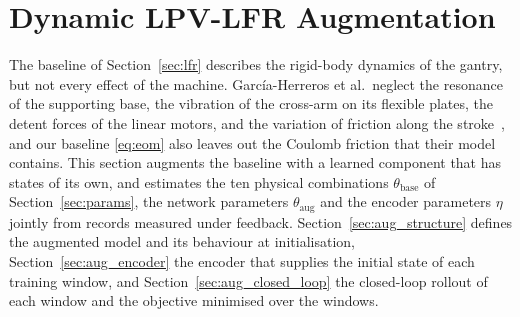 \section{Dynamic LPV-LFR Augmentation}\label{sec:augmentation}

The baseline of Section~\ref{sec:lfr} describes the rigid-body dynamics of
the gantry, but not every effect of the machine.
Garc\'ia-Herreros et al.\ neglect the resonance of the supporting base, the
vibration of the cross-arm on its flexible plates, the detent forces of the
linear motors, and the variation of friction along the
stroke~\cite[Sec.~2.4]{garcia2013model}, and our baseline \eqref{eq:eom}
also leaves out the Coulomb friction that their model contains.
This section augments the baseline with a learned component that has states
of its own, and estimates the ten physical combinations
$\theta_{\mathrm{base}}$ of Section~\ref{sec:params}, the network parameters
$\theta_{\mathrm{aug}}$ and the encoder parameters $\eta$ jointly from records
measured under feedback.
Section~\ref{sec:aug_structure} defines the augmented model and its behaviour
at initialisation, Section~\ref{sec:aug_encoder} the encoder that supplies the
initial state of each training window, and Section~\ref{sec:aug_closed_loop}
the closed-loop rollout of each window and the objective minimised over the
windows.

